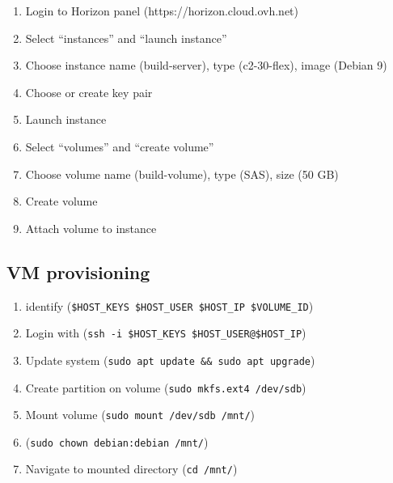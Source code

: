 \documentclass[printmode]{mgr}
\begin{document}
\begin{enumerate}
  \item Login to Horizon panel (https://horizon.cloud.ovh.net)
  \item Select ``instances'' and ``launch instance''
  \item Choose instance name (build-server), type (c2-30-flex), image (Debian 9)
  \item Choose or create key pair
  \item Launch instance
  \item Select ``volumes'' and ``create volume'' %
  \item Choose volume name (build-volume), type (SAS), size (50 GB)
  \item Create volume
  \item Attach volume to instance
\end{enumerate}

\subsection*{VM provisioning}

\begin{enumerate}
  \item identify (\verb|$HOST_KEYS $HOST_USER $HOST_IP $VOLUME_ID|)
  \item Login with (\verb|ssh -i $HOST_KEYS $HOST_USER@$HOST_IP|)
  \item Update system (\verb|sudo apt update && sudo apt upgrade|)
  \item Create partition on volume (\verb|sudo mkfs.ext4 /dev/sdb|)
  \item Mount volume (\verb|sudo mount /dev/sdb /mnt/|)
  \item (\verb|sudo chown debian:debian /mnt/|)
  \item Navigate to mounted directory (\verb|cd /mnt/|)
\end{enumerate}
\end{document}
